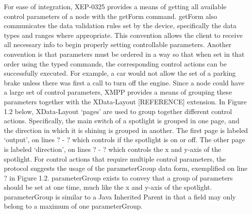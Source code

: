         For ease of integration, XEP-0325 provides a means of getting all available control parameters of a node with the getForm command. getForm also communicates the data validation rules set by the device, specifically the data types and ranges where appropriate. This convention allows the client to receive all necessary info to begin properly setting controllable parameters. Another convention is that parameters must be ordered in a way so that when set in that order using the typed commands, the corresponding control actions can be successfully executed. For example, a car would not allow the set of a parking brake unless there was first a call to turn off the engine. 
        Since a node could have a large set of control parameters, XMPP provides a means of grouping these parameters together with the XData-Layout [REFERENCE] extension. In Figure 1.2 below, XData-Layout ‘pages’ are used to group together different control actions. Specifically, the main switch of a spotlight is grouped in one page, and the direction in which it is shining is grouped in another. The first page is labeled ‘output’, on lines ? - ? which controls if the spotlight is on or off. The other page is labeled ‘direction’, on lines ? - ? which controls the x and y-axis of the spotlight.
        For control actions that require multiple control parameters, the protocol suggests the usage of the parameterGroup data form, exemplified on line ? in Figure 1.2. parameterGroup exists to convey that a group of parameters should be set at one time, much like the x and y-axis of the spotlight. parameterGroup is similar to a Java Inherited Parent in that a field may only belong to a maximum of one parameterGroup. 
